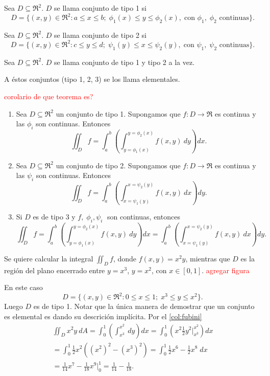 \begin{definition}
    Sea $D\subseteq\Re^2$. $D$ se llama conjunto de tipo 1 si
    \[
        D=\{(x,y)\in\Re^2: a\leq x\leq b;\;\phi_1(x)\leq y\leq \phi_2(x),\;\text{con }\phi_1,\;\phi_2\text{ continuas}\}.
    \]
\end{definition}
\begin{definition}
    Sea $D\subseteq\Re^2$. $D$ se llama conjunto de tipo 2 si
    \[
        D=\{(x,y)\in\Re^2: c\leq y\leq d;\;\psi_1(y)\leq x\leq \psi_2(y),\;\text{con }\psi_1,\;\psi_2\text{ continuas}\}.
    \]
\end{definition}
\begin{definition}
    Sea $D\subseteq\Re^2$. $D$ se llama conjunto de tipo 1 y tipo 2 a la vez.
\end{definition}
\begin{definition}
    A \'estos conjuntos (tipo 1, 2, 3) se los llama elementales.
\end{definition}
\begin{corollary} \label{col:fubini}
    \textcolor{red}{corolario de que teorema es?}
    \begin{enumerate}
        \item Sea $D\subseteq\Re^2$ un conjunto de tipo 1. Supongamos que $f:D\to\Re$ es continua y las $\phi_i$ son continuas. Entonces
        \[
            \iint_D f=\int_a^b\left(\int_{y=\phi_1(x)}^{y=\phi_2(x)}f(x,y)\:dy\right)dx.  
        \]
        \item Sea $D\subseteq\Re^2$ un conjunto de tipo 2. Supongamos que $f:D\to\Re$ es continua y las $\psi_i$ son continuas. Entonces
        \[
            \iint_D f=\int_a^b\left(\int_{x=\psi_1(y)}^{x=\psi_2(y)}f(x,y)\:dx\right)dy.  
        \]
        \item Si $D$ es de tipo 3 y $f,\;\phi_i,\psi_i\;$ son continuas, entonces 
        \[
            \iint_D f=\int_a^b\left(\int_{y=\phi_1(x)}^{y=\phi_2(x)}f(x,y)\:dy\right)dx=\int_a^b\left(\int_{x=\psi_1(y)}^{x=\psi_2(y)}f(x,y)\:dx\right)dy. 
        \]
    \end{enumerate}
\end{corollary}
\begin{example}
    Se quiere calcular la integral $\iint_D f$, donde $f(x,y)=x^2y$, mientras que $D$ es la regi\'on del plano encerrado entre $y=x^3$, $y=x^2$, con $x\in[0,1]$. \textcolor{red}{agregar figura}

    En este caso 
    \[
        D=\{(x,y)\in\Re^2:0\leq x\leq1;\;x^3\leq y\leq x^2\}.  
    \]
    Luego $D$ es de tipo 1. Notar que la \'unica manera de demostrar que un conjunto es elemental es dando su descrici\'on impl\'icita. Por el \autoref{col:fubini}
    \begin{gather*}
        \iint_D x^2y\:dA=\int_0^1\left(\int_{x^3}^{x^2}\:dy\right)dx=\int_0^1\left(x^2\frac{1}{2}y^2\Big\lvert_{x^3}^{x^2}\right)dx\\
        =\int_0^1\frac{1}{2}x^2\left((x^2)^2-(x^3)^2\right)=\int_0^1\frac{1}{2}x^6-\frac{1}{2}x^8\;dx\\=\frac{1}{14}x^7-\frac{1}{18}x^9\Big\lvert_0^1=\frac{1}{14}-\frac{1}{18}.
    \end{gather*}
\end{example}
